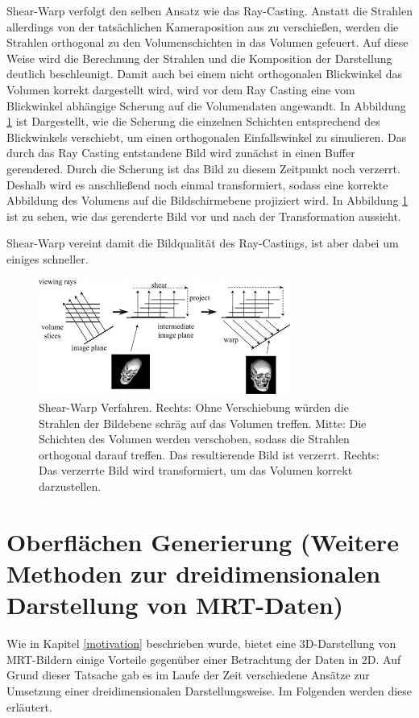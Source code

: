 Shear-Warp verfolgt den selben Ansatz wie das Ray-Casting. Anstatt die Strahlen allerdings von der tatsächlichen Kameraposition aus zu verschießen, werden die Strahlen orthogonal zu den Volumenschichten in das Volumen gefeuert. Auf diese Weise wird die Berechnung der Strahlen und die Komposition der Darstellung deutlich beschleunigt. 
Damit auch bei einem nicht orthogonalen Blickwinkel das Volumen korrekt dargestellt wird, wird vor dem Ray Casting eine vom Blickwinkel abhängige Scherung auf die Volumendaten angewandt. In Abbildung \ref{img:shearwarp} ist Dargestellt, wie die Scherung die einzelnen Schichten entsprechend des Blickwinkels verschiebt, um einen orthogonalen Einfallswinkel zu simulieren. 
Das durch das Ray Casting entstandene Bild wird zunächst in einen Buffer gerendered. Durch die Scherung ist das Bild zu diesem Zeitpunkt noch verzerrt. Deshalb wird es anschließend noch einmal transformiert, sodass eine korrekte Abbildung des Volumens auf die Bildschirmebene projiziert wird. In Abbildung \ref{img:shearwarp} ist zu sehen, wie das gerenderte Bild vor und nach der Transformation aussieht. 

Shear-Warp vereint damit die Bildqualität des Ray-Castings, ist aber dabei um einiges schneller.

\begin{figure}
	\centering
	\includegraphics[width=0.7\linewidth]{images/shearwarp.png}
	\caption{Shear-Warp Verfahren. Rechts: Ohne Verschiebung würden die Strahlen der Bildebene schräg auf das Volumen treffen. Mitte: Die Schichten des Volumen werden verschoben, sodass die Strahlen orthogonal darauf treffen. Das resultierende Bild ist verzerrt. Rechts: Das verzerrte Bild wird transformiert, um das Volumen korrekt darzustellen.}
	\label{img:shearwarp}
\end{figure}



\section{Oberflächen Generierung (Weitere Methoden zur dreidimensionalen Darstellung von MRT-Daten)}		 %
Wie in Kapitel \ref{motivation} beschrieben wurde, bietet eine 3D-Darstellung von MRT-Bildern einige Vorteile gegenüber einer Betrachtung der Daten in 2D. 
Auf Grund dieser Tatsache gab es im Laufe der Zeit verschiedene Ansätze zur Umsetzung einer dreidimensionalen Darstellungsweise. 
Im Folgenden werden diese erläutert. 


